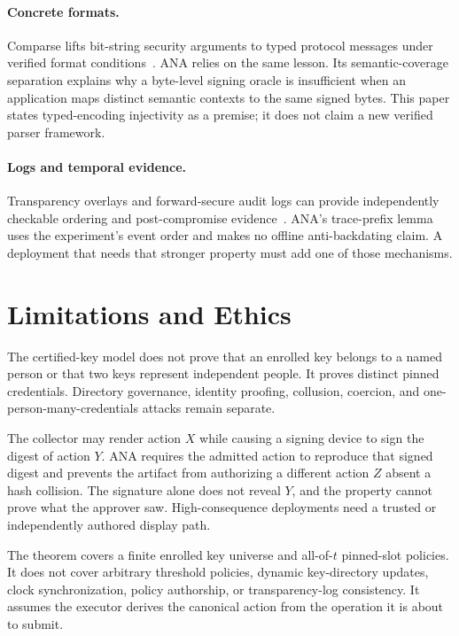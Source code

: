 \documentclass[10pt]{article}
\begin{document}
\paragraph{Concrete formats.}
Comparse lifts bit-string security arguments to typed protocol messages under
verified format conditions~\cite{comparse}. ANA relies on the same lesson. Its
semantic-coverage separation explains why a byte-level signing oracle is
insufficient when an application maps distinct semantic contexts to the same
signed bytes. This paper states typed-encoding injectivity as a premise; it does
not claim a new verified parser framework.

\paragraph{Logs and temporal evidence.}
Transparency overlays and forward-secure audit logs can provide independently
checkable ordering and post-compromise evidence~\cite{transparencyoverlays,secureauditlogs}.
ANA's trace-prefix lemma uses the experiment's event order and makes no offline
anti-backdating claim. A deployment that needs that stronger property must add
one of those mechanisms.

\section{Limitations and Ethics}

The certified-key model does not prove that an enrolled key belongs to a named
person or that two keys represent independent people. It proves distinct pinned
credentials. Directory governance, identity proofing, collusion, coercion, and
one-person-many-credentials attacks remain separate.

The collector may render action $X$ while causing a signing device to sign
the digest of action $Y$. ANA requires the admitted action to reproduce that
signed digest and prevents the artifact from authorizing a different action
$Z$ absent a hash collision. The signature alone does not reveal $Y$, and the
property cannot prove what the approver saw. High-consequence deployments need
a trusted or independently authored display path.

The theorem covers a finite enrolled key universe and all-of-$t$ pinned-slot
policies. It does not cover arbitrary threshold policies, dynamic key-directory
updates, clock synchronization, policy authorship, or transparency-log
consistency. It assumes the executor derives the canonical action from the
operation it is about to submit.
\end{document}
